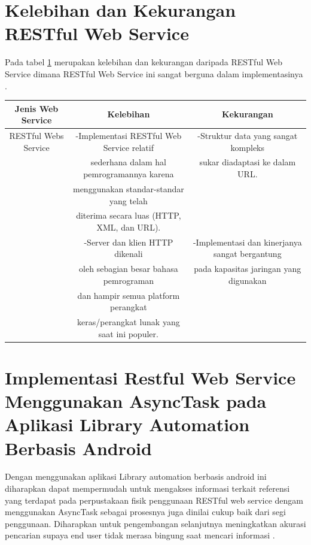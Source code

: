 \section{Kelebihan dan Kekurangan RESTful Web Service}
Pada tabel \ref{table:contoh} merupakan kelebihan dan kekurangan daripada RESTful Web Service dimana RESTful Web Service ini sangat berguna dalam implementasinya \cite{nugroho2012perbandingan}.
\begin{table}[h]
\begin{tabular}{|c|c|c|}
\hline
Jenis Web Service&Kelebihan&Kekurangan\\
\hline
RESTful Webs Service&-Implementasi RESTful Web Service relatif& -Struktur data yang sangat kompleks\\
&sederhana dalam hal pemrogramannya karena& sukar diadaptasi ke dalam URL.\\
&menggunakan standar-standar yang telah&\\
&diterima secara luas (HTTP, XML, dan URL).&\\
&-Server dan klien HTTP dikenali&-Implementasi dan kinerjanya sangat bergantung\\
&oleh sebagian besar bahasa pemrograman&pada kapasitas jaringan yang digunakan\\
&dan hampir semua platform perangkat&\\
&keras/perangkat lunak yang saat ini populer.&\\
\hline
\end{tabular}
\label{table:contoh}
\end{table}


\section{Implementasi Restful Web Service Menggunakan AsyncTask pada Aplikasi Library Automation Berbasis Android}
Dengan menggunakan aplikasi Library automation berbasis android ini diharapkan dapat mempermudah untuk mengakses informasi terkait referensi yang terdapat pada perpustakaan fisik penggunaan RESTful web service dengam menggunakan AsyncTask sebagai prosesnya juga dinilai cukup baik dari segi penggunaan. Diharapkan untuk pengembangan selanjutnya meningkatkan akurasi pencarian supaya end user tidak merasa bingung saat mencari informasi \cite{yudhistiraimplementasi}.


